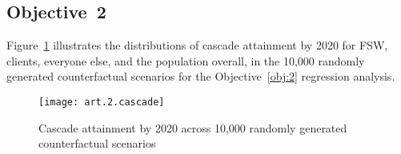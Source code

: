 \subsection{Objective~2}\label{sr.obj.2}
Figure~\ref{fig:obj.2.cascade} illustrates the distributions of cascade attainment by 2020
for FSW, clients, everyone else, and the population overall,
in the 10,000 randomly generated counterfactual scenarios
for the Objective~\ref{obj:2} regression analysis.
\begin{figure}[h]
  \centering
  \texttt{[image: art.2.cascade]}
  \caption{Cascade attainment by 2020 across 10,000 randomly generated counterfactual scenarios}
  \label{fig:obj.2.cascade}
\end{figure}
